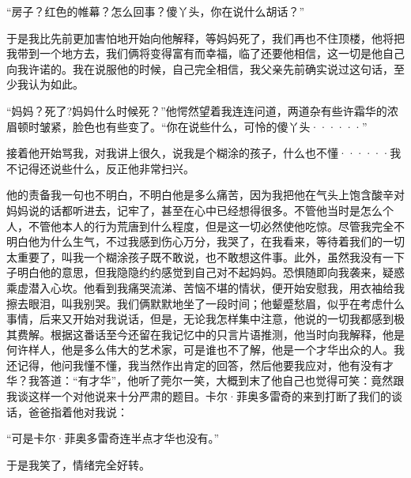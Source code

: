 \documentclass[12pt, UTF8]{ctexbook}
\begin{document}
\par “房子？红色的帷幕？怎么回事？傻丫头，你在说什么胡话？”
\par 于是我比先前更加害怕地开始向他解释，等妈妈死了，我们再也不住顶楼，他将把我带到一个地方去，我们俩将变得富有而幸福，临了还要他相信，这一切是他自己向我许诺的。我在说服他的时候，自己完全相信，我父亲先前确实说过这句话，至少我认为如此。
\par “妈妈？死了?妈妈什么时候死？”他愕然望着我连连问道，两道杂有些许霜华的浓眉顿时皱紧，脸色也有些变了。“你在说些什么，可怜的傻丫头······”
\par 接着他开始骂我，对我讲上很久，说我是个糊涂的孩子，什么也不懂······我不记得还说些什么，反正他非常扫兴。
\par 他的责备我一句也不明白，不明白他是多么痛苦，因为我把他在气头上饱含酸辛对妈妈说的话都听进去，记牢了，甚至在心中已经想得很多。不管他当时是怎么个人，不管他本人的行为荒唐到什么程度，但是这一切必然使他吃惊。尽管我完全不明白他为什么生气，不过我感到伤心万分，我哭了，在我看来，等待着我们的一切太重要了，叫我一个糊涂孩子既不敢说，也不敢想这件事。此外，虽然我没有一下子明白他的意思，但我隐隐约约感觉到自己对不起妈妈。恐惧随即向我袭来，疑惑乘虚潜入心坎。他看到我痛哭流涕、苦恼不堪的情状，便开始安慰我，用衣袖给我擦去眼泪，叫我别哭。我们俩默默地坐了一段时间；他颦蹙愁眉，似乎在考虑什么事情，后来又开始对我说话，但是，无论我怎样集中注意，他说的一切我都感到极其费解。根据这番话至今还留在我记忆中的只言片语推测，他当时向我解释，他是何许样人，他是多么伟大的艺术家，可是谁也不了解，他是一个才华出众的人。我还记得，他问我懂不懂，我当然作出肯定的回答，然后他要我应对，他有没有才华？我答道：“有才华”，他听了莞尔一笑，大概到末了他自己也觉得可笑：竟然跟我谈这样一个对他说来十分严肃的题目。卡尔·菲奥多雷奇的来到打断了我们的谈话，爸爸指着他对我说：
\par “可是卡尔·菲奥多雷奇连半点才华也没有。”
\par 于是我笑了，情绪完全好转。
\end{document}
